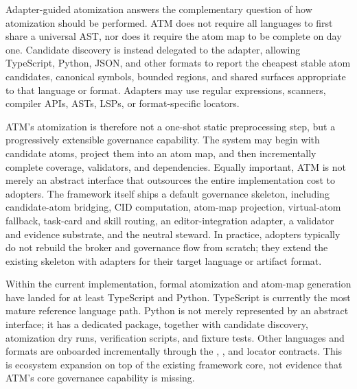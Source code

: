 \documentclass[9pt,letterpaper]{extarticle}
\begin{document}
Adapter-guided atomization answers the complementary question of how atomization should be performed. ATM does not require all languages to first share a universal AST, nor does it require the atom map to be complete on day one. Candidate discovery is instead delegated to the adapter, allowing TypeScript, Python, JSON, and other formats to report the cheapest stable atom candidates, canonical symbols, bounded regions, and shared surfaces appropriate to that language or format. Adapters may use regular expressions, scanners, compiler APIs, ASTs, LSPs, or format-specific locators.

ATM's atomization is therefore not a one-shot static preprocessing step, but a progressively extensible governance capability. The system may begin with candidate atoms, project them into an atom map, and then incrementally complete coverage, validators, and dependencies. Equally important, ATM is not merely an abstract interface that outsources the entire implementation cost to adopters. The framework itself ships a default governance skeleton, including candidate-atom bridging, CID computation, atom-map projection, virtual-atom fallback, task-card and skill routing, an editor-integration adapter, a validator and evidence substrate, and the neutral steward. In practice, adopters typically do not rebuild the broker and governance flow from scratch; they extend the existing skeleton with adapters for their target language or artifact format.

Within the current implementation, formal atomization and atom-map generation have landed for at least TypeScript and Python. TypeScript is currently the most mature reference language path. Python is not merely represented by an abstract interface; it has a dedicated \texttt{} package, together with candidate discovery, atomization dry runs, verification scripts, and fixture tests. Other languages and formats are onboarded incrementally through the \texttt{}, \texttt{}, and locator contracts. This is ecosystem expansion on top of the existing framework core, not evidence that ATM's core governance capability is missing.
\end{document}
